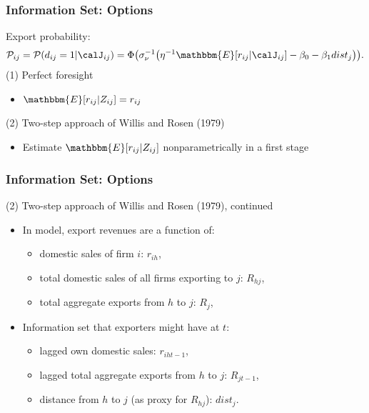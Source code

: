 \begin{frame}
\frametitle{Information Set: Options}
Export probability:
	\begin{align*}
	\mathcal{P}_{ij}=\mathcal{P}(d_{ij}=1|\calJ_{ij})=\Phi\big(\sigma_{\nu}^{-1}\big(\eta^{-1}\mathbbm{E}[r_{ij}|\calJ_{ij}]-\beta_{0}-\beta_{1}dist_{j}\big)\big).
	\end{align*}
(1) Perfect foresight
\begin{itemize}
\item $\mathbbm{E}[r_{ij}|Z_{ij}]=r_{ij}$
\end{itemize}
(2) Two-step approach of Willis and Rosen (1979)
\begin{itemize}
\item Estimate $\mathbbm{E}[r_{ij}|Z_{ij}]$ nonparametrically in a first stage 
\end{itemize}
\end{frame}

\begin{frame}
\frametitle{Information Set: Options}

(2) Two-step approach of Willis and Rosen (1979), continued
\begin{itemize}
	\item In model, export revenues are a function of:
	\begin{itemize}
		\item domestic sales of firm $i$: $r_{ih}$,
		\item total domestic sales of all firms exporting to $j$: $R_{hj}$,
		\item total aggregate exports from $h$ to $j$: $R_{j}$,
	\end{itemize}
	\item Information set that exporters might have at $t$:
	\begin{itemize}
		\item lagged own domestic sales: $r_{iht-1}$,
		\item lagged total aggregate exports from $h$ to $j$: $R_{jt-1}$,
		\item distance from $h$ to $j$ (as proxy for $R_{hj}$): $dist_{j}$.
	\end{itemize}
\end{itemize}
\end{frame}



